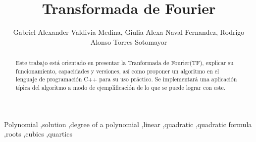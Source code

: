 \documentclass[review,1p]{elsarticle}
\begin{document}
\makeatletter
\def\ps@pprintTitle{%
  \let\@oddhead\@empty
  \let\@evenhead\@empty
  \let\@oddfoot\@empty
  \let\@evenfoot\@oddfoot
}
\makeatother

\begin{frontmatter}


\title{Transformada de Fourier}




\author{Gabriel Alexander Valdivia Medina, Giulia Alexa Naval Fernandez, Rodrigo Alonso Torres Sotomayor}

\address{Universidad Católica San Pablo, Arequipa.}

\begin{abstract}
Este trabajo está orientado en presentar la Tranformada de Fourier(TF),
explicar su funcionamiento, capacidades y versiones, así como proponer un
algoritmo en el lenguaje de programación C++ para su uso práctico. Se implementará 
una aplicación típica del algoritmo a modo de ejemplificación de lo que se puede
lograr con este. 
\end{abstract}

\begin{keyword}
Polynomial \sep solution \sep degree of a polynomial \sep linear 
\sep quadratic \sep quadratic formula \sep roots \sep cubics \sep quartics


\end{keyword}

\end{frontmatter}
\end{document}
